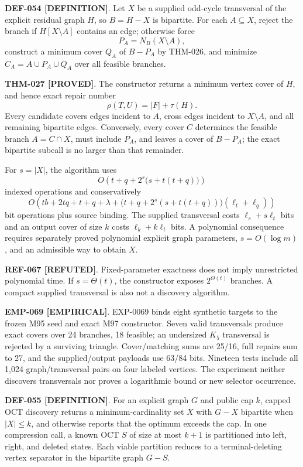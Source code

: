 \documentclass[11pt]{article}
\newcommand{\claimstatus}[2]{\textbf{#1 [#2]}}
\begin{document}
\claimstatus{DEF-054}{DEFINITION}. Let \(X\) be a supplied odd-cycle
transversal of the explicit residual graph \(H\), so \(B=H-X\) is
bipartite. For each \(A\subseteq X\), reject the branch if
\(H[X\setminus A]\) contains an edge; otherwise force
\[
 P_A=N_B(X\setminus A),
\]
construct a minimum cover \(Q_A\) of \(B-P_A\) by THM-026, and minimize
\(C_A=A\cup P_A\cup Q_A\) over all feasible branches.

\claimstatus{THM-027}{PROVED}. The constructor returns a minimum vertex
cover of \(H\), and hence exact repair number
\[
 \rho(T,U)=|F|+\tau(H).
\]
Every candidate covers edges incident to \(A\), cross edges incident to
\(X\setminus A\), and all remaining bipartite edges. Conversely, every
cover \(C\) determines the feasible branch \(A=C\cap X\), must include
\(P_A\), and leaves a cover of \(B-P_A\); the exact bipartite subcall is no
larger than that remainder.

For \(s=|X|\), the algorithm uses
\[
 O\!\left(t+q+2^s\bigl(s+t(t+q)\bigr)\right)
\]
indexed operations and conservatively
\[
 O\!\left(
 tb+2tq+t+q+\lambda+
 \bigl(t+q+2^s(s+t(t+q))\bigr)(\ell_t+\ell_q)
 \right)
\]
bit operations plus source binding. The supplied transversal costs
\(\ell_s+s\ell_t\) bits and an output cover of size \(k\) costs
\(\ell_k+k\ell_t\) bits. A polynomial consequence requires separately
proved polynomial explicit graph parameters, \(s=O(\log m)\), and an
admissible way to obtain \(X\).

\claimstatus{REF-067}{REFUTED}. Fixed-parameter exactness does not imply
unrestricted polynomial time. If \(s=\Theta(t)\), the constructor exposes
\(2^{\Theta(t)}\) branches. A compact supplied transversal is also not a
discovery algorithm.

\claimstatus{EMP-069}{EMPIRICAL}. EXP-0069 binds eight synthetic targets to
the frozen M95 seed and exact M97 constructor. Seven valid transversals
produce exact covers over 24 branches, 18 feasible; an undersized \(K_5\)
transversal is rejected by a surviving triangle. Cover/matching sums are
25/16, full repairs sum to 27, and the supplied/output payloads use 63/84
bits. Nineteen tests include all 1,024 graph/transversal pairs on four
labeled vertices. The experiment neither discovers transversals nor proves
a logarithmic bound or new selector occurrence.

\claimstatus{DEF-055}{DEFINITION}. For an explicit graph \(G\) and public
cap \(k\), capped OCT discovery returns a minimum-cardinality set \(X\) with
\(G-X\) bipartite when \(|X|\le k\), and otherwise reports that the optimum
exceeds the cap. In one compression call, a known OCT \(S\) of size at most
\(k+1\) is partitioned into left, right, and deleted states. Each viable
partition reduces to a terminal-deleting vertex separator in the bipartite
graph \(G-S\).
\end{document}
